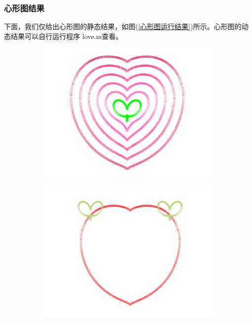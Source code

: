         \subsubsection{心形图结果}
            \par
            下面，我们仅给出心形图的静态结果，如图(\ref{心形图运行结果})所示。心形图的动态结果可以自行运行程序 love.m查看。
                \begin{figure}[htbp]
                    \centering
                    \begin{subfigure}[b]{0.4\textwidth}
                        \includegraphics[width=\textwidth]{images/44.png}
                        \caption{}
                        \label{爱心萌芽}
                    \end{subfigure}
                    \begin{subfigure}[b]{0.4\textwidth}
                        \includegraphics[width=\textwidth]{images/45.png}

\end{subfigure}
\end{figure}
